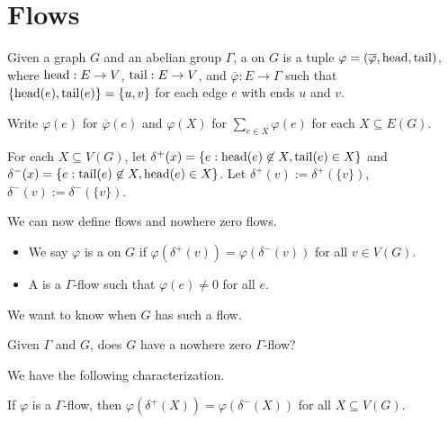 \documentclass[main.tex]{subfiles}
\begin{document}
\section{Flows} 
\begin{definition*}
  Given a graph $G$ and an abelian group $\Gamma$,
  a  on $G$ is a tuple
  $\varphi = (\overline{\varphi}, \operatorname{head}, \operatorname{tail})$,
  where $\operatorname{head}: E \to V$, $\operatorname{tail}: E \to V$,
  and $\overline{\varphi} : E \to \Gamma$ such that
  $\{\operatorname{head}(e), \operatorname{tail}(e) \} = \{u, v\}$ for each edge $e$ with
  ends $u$ and $v$.
\end{definition*}
Write $\varphi(e)$ for $\overline{\varphi}(e)$ and $\varphi(X)$ for
$\sum_{e \in X} \varphi(e)$ for each $X \subseteq E(G)$.
\begin{notation*}
For each $X \subseteq V(G)$, let $\delta^+(x) = \{e : \operatorname{head}(e) \not \in X, \operatorname{tail}(e) \in X\}$ and $\delta^-(x) = \{e : \operatorname{tail}(e) \not \in X, \operatorname{head}(e) \in X\}$. Let $\delta^+(v) := \delta^+(\{v\})$, $\delta^-(v) := \delta^-(\{v\})$. 
\end{notation*}
We can now define flows and nowhere zero flows.
\begin{definition*}
  \listhack
  \begin{itemize}
    \item We say $\varphi$ is a  on $G$ if
      $\varphi(\delta^+(v)) = \varphi(\delta^-(v))$ for all $v \in V(G)$.

    \item A  is a
      $\Gamma$-flow such that $\varphi(e)\neq 0$ for all $e$.
  \end{itemize}
\end{definition*}
We want to know when $G$ has such a flow.
\begin{question*}
  Given $\Gamma$ and $G$, does $G$ have a nowhere zero $\Gamma$-flow?
\end{question*}
We have the following characterization.
\begin{lemma}
  If $\varphi$ is a $\Gamma$-flow,
  then $\varphi(\delta^+(X)) = \varphi(\delta^-(X))$ for all $X\subseteq V(G)$.
\end{lemma}
\end{document}
